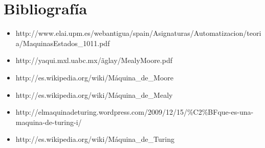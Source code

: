 \chapter*{Bibliograf\'ia}
\begin{itemize}
	\item http://www.elai.upm.es/webantigua/spain/Asignaturas/Automatizacion/teoria/MaquinasEstados\_1011.pdf
	\item http://yaqui.mxl.uabc.mx/\~aglay/MealyMoore.pdf
	\item http://es.wikipedia.org/wiki/M\'aquina\_de\_Moore
	\item http://es.wikipedia.org/wiki/M\'aquina\_de\_Mealy
	\item http://elmaquinadeturing.wordpress.com/2009/12/15/\%C2\%BFque-es-una-maquina-de-turing-i/
	\item http://es.wikipedia.org/wiki/M\'aquina\_de\_Turing
\end{itemize}